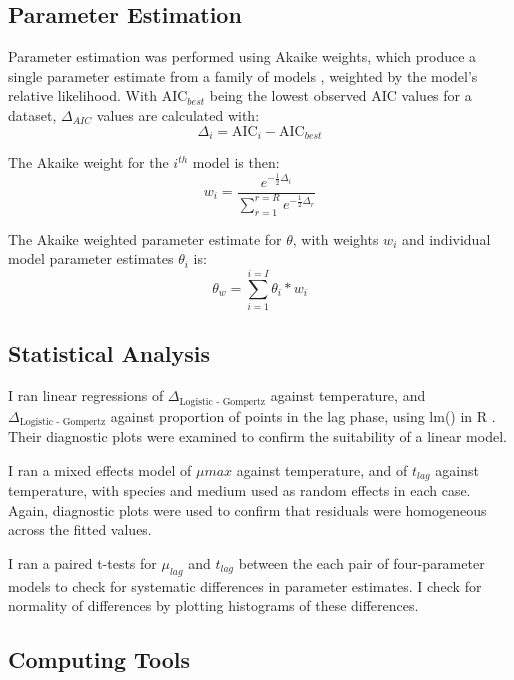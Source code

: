 \documentclass[11pt, a4paper]{article}
\begin{document}
\begin{linenumbers}
\subsection{Parameter Estimation}

Parameter estimation was performed using Akaike weights, which produce a single parameter estimate from a family of models \cite{ModelSelection}, weighted by the model’s relative likelihood.
With $\text{AIC}_{best}$ being the lowest observed AIC values for a dataset, $\Delta_{AIC}$ values are calculated with:
\[ \Delta_i = \text{AIC}_i - \text{AIC}_{best} \]

The Akaike weight for the $i^{th}$ model is then:
\[ w_i = \frac{e^{-\frac{1}{2}\Delta_i }} { \sum_{r = 1}^{r = R}  e^{- \frac{1}{2}\Delta_r }}\]

The Akaike weighted parameter estimate for $\theta$, with weights $w_i$ and individual model parameter estimates $\theta_i$ is:
\[\theta_w = \sum_{i = 1}^{i = I}\theta_i * w_i\]


\subsection{Statistical Analysis}

I ran linear regressions of $\Delta_{\text{Logistic - Gompertz}}$ against temperature, and $\Delta_{\text{Logistic - Gompertz}}$ against proportion of points in the lag phase, using lm() in R \cite{R}. Their diagnostic plots were examined to confirm the suitability of a linear model.

I ran a mixed effects model of $\mu{max}$ against temperature, and of $t_{lag}$ against temperature, with species and medium used as random effects in each case. Again, diagnostic plots were used to confirm that residuals were homogeneous across the fitted values.

I ran a paired t-tests for $\mu_{lag}$ and $t_{lag}$ between the each pair of four-parameter models to check for systematic differences in parameter estimates. I check for normality of differences by plotting histograms of these differences.  

\subsection{Computing Tools}

\end{linenumbers}
\end{document}
